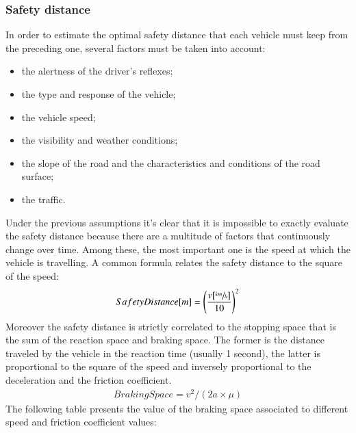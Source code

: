 \subsubsection{Safety distance}
\label{sec:Safety_distance}
In order to estimate the optimal safety distance that each vehicle must keep from the preceding one, several factors must be taken into account:
\begin{itemize}
    \item the alertness of the driver's reflexes;
    \item the type and response of the vehicle;
    \item the vehicle speed;
    \item the visibility and weather conditions;
    \item the slope of the road and the characteristics and conditions of the road surface;
    \item the traffic.
\end{itemize}
Under the previous assumptions it's clear that it is impossible to exactly evaluate the safety distance because there are a multitude of factors that continuously change over time.
Among these, the most important one is the speed at which the vehicle is travelling. A common formula relates the safety distance to the square of the speed:
\begin{align}
   SafetyDistance [m] = \left(\frac{v[\sfrac{km}{h}]}{10}\right)^2
   \label{eq:safetyDistance}
\end{align}
Moreover the safety distance is strictly correlated to the stopping space that is the sum of the reaction space and braking space.
The former is the distance traveled by the vehicle in the reaction time (usually 1 second), the latter is proportional to the square of the speed and inversely proportional to the deceleration and the friction coefficient.
\begin{align}
    BrakingSpace = v^2/(2a \times \mu)
\end{align} 
The following table presents the value of the braking space associated to different speed and friction coefficient values:
